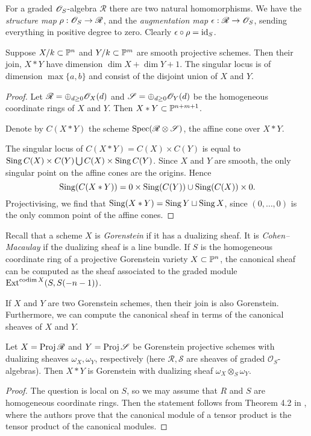 For a graded $\OO_S$-algebra $\mathscr R$ there are two natural homomorphisms. We have the \emph{structure map} $\rho: \OO_S \to \mathscr R$, and the \emph{augmentation map} $\epsilon: \mathscr R \to \OO_S$, sending everything in positive degree to zero. Clearly $\epsilon \circ \rho = \id_S$.



\begin{proposition}
\label{lemma:join}
Suppose $X/k \subset \P^n$ and $Y/k \subset \P^m$ are smooth projective schemes. Then their join, $X \ast Y$ have dimension $\dim X+\dim Y+1$. The singular locus is of dimension $\max\{a,b\}$ and consist of the disjoint union of $X$ and $Y$.
\end{proposition}
\begin{proof}
Let $\mathscr R = \oplus_{d \geq 0} \OO_X(d)$ and $\mathscr S = \oplus_{d \geq 0} \OO_Y(d)$ be the homogeneous coordinate rings of $X$ and $Y$. Then $X \ast Y \subset \P^{n+m+1}$. 

Denote by $C(X \ast Y)$ the scheme $\Spec (\mathscr R \otimes \mathscr S)$, the affine cone over $X \ast Y$. 

The singular locus of $C(X \ast Y) = C(X) \times C(Y)$ is equal to $\Sing C(X) \times C(Y) \bigcup C(X) \times \Sing C(Y)$. Since $X$ and $Y$ are smooth, the only singular point on the affine cones are the origins. Hence
$$
\Sing(C(X \ast Y)) = 0 \times \Sing(C(Y)) \cup \Sing(C(X)) \times 0.
$$
Projectivising, we find that $\Sing(X \ast Y) = \Sing Y \sqcup \Sing X$, since $(0,\ldots,0)$ is the only common point of the affine cones. 
\end{proof}

Recall that a scheme $X$ is \emph{Gorenstein} if it has a dualizing sheaf. It is \emph{Cohen--Macaulay} if the dualizing sheaf is a line bundle. If $S$ is the homogeneous coordinate ring of a projective Gorenstein variety $X \subset \P^n$, the canonical sheaf can be computed as the sheaf associated to the graded module $\Ext^{\codim X}(S,S(-n-1))$.

If $X$ and $Y$ are two Gorenstein schemes, then their join is also Gorenstein. Furthermore, we can compute the canonical sheaf in terms of the canonical sheaves of $X$ and $Y$.

\begin{proposition}
Let $X=\Proj \mathscr R$ and $Y=\Proj \mathscr S$ be Gorenstein projective schemes with dualizing sheaves $\omega_X, \omega_Y$, respectively (here $\mathscr R,\mathscr S$ are sheaves of graded $\mathscr O_S$-algebras). Then $X \ast Y$ is Gorenstein with  dualizing sheaf $\omega_X \otimes_{S} \omega_Y$.
\end{proposition}
\begin{proof}
The question is local on $S$, so we may assume that $R$ and $S$ are homogeneous coordinate rings. Then the statement follows from Theorem 4.2 in \cite{herzog_canonical}, where the authors prove that the canonical module of a tensor product is the tensor product of the canonical modules.
\end{proof}

